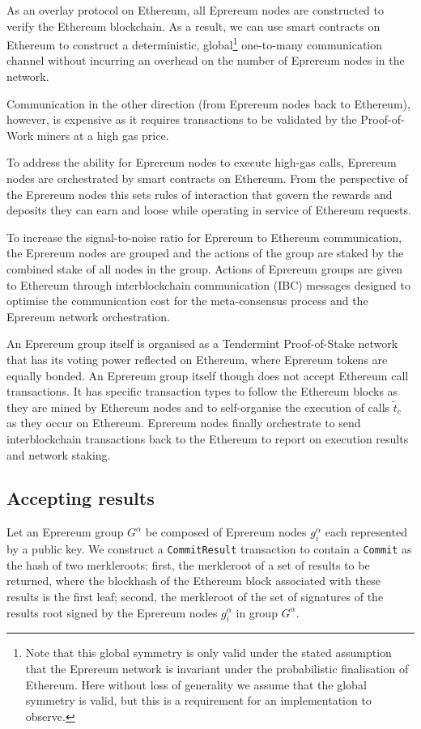 \documentclass[twocolumn]{article}
\begin{document}
As an overlay protocol on Ethereum, all Eprereum nodes are constructed to verify the Ethereum blockchain.  As a result, we can use smart contracts on Ethereum to construct a deterministic, global\footnote{Note that this global symmetry is only valid under the stated assumption that the Eprereum network is invariant under the probabilistic finalisation of Ethereum.  Here without loss of generality we assume that the global symmetry is valid, but this is a requirement for an implementation to observe.} one-to-many communication channel without incurring an overhead on the number of Eprereum nodes in the network.

Communication in the other direction (from Eprereum nodes back to Ethereum), however, is expensive as it requires transactions to be validated by the Proof-of-Work miners at a high gas price.

To address the ability for Eprereum nodes to execute high-gas calls, Eprereum nodes are orchestrated by smart contracts on Ethereum.  From the perspective of the Eprereum nodes this sets rules of interaction that govern the rewards and deposits they can earn and loose while operating in service of Ethereum requests.

To increase the signal-to-noise ratio for Eprereum to Ethereum communication, the Eprereum nodes are grouped and the actions of the group are staked by the combined stake of all nodes in the group. Actions of Eprereum groups are given to Ethereum through interblockchain communication (IBC) messages designed to optimise the communication cost for the meta-consensus process and the Eprereum network orchestration.  

An Eprereum group itself is organised as a Tendermint Proof-of-Stake network that has its voting power reflected on Ethereum, where Eprereum tokens are equally bonded.  An Eprereum group itself though does not accept Ethereum call transactions.  It has specific transaction types to follow the Ethereum blocks as they are mined by Ethereum nodes and to self-organise the execution of calls $\tilde{t}_c$ as they occur on Ethereum. Eprereum nodes finally orchestrate to send interblockchain transactions back to the Ethereum to report on execution results and network staking.

\subsection{Accepting results}

Let an Eprereum group $G^\alpha$ be composed of Eprereum nodes $g^\alpha_i$ each represented by a public key. We construct a \texttt{CommitResult} transaction to contain a \texttt{Commit} as the hash of two merkleroots: first, the merkleroot of a set of results to be returned, where the blockhash of the Ethereum block associated with these results is the first leaf; second, the merkleroot of the set of signatures of the results root signed by the Eprereum nodes $g^\alpha_i$ in group $G^\alpha$.
\end{document}
